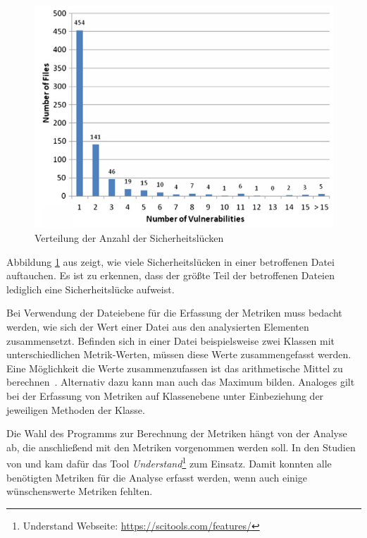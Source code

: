\begin{figure}
	\includegraphics[width=\textwidth]{img/vulnerability_distribution.png}
	\caption{Verteilung der Anzahl der Sicherheitslücken \cite{chowdhury_zulkernine_2009}}
	\label{fig:vulnerability_distribution}
\end{figure}
Abbildung \ref{fig:vulnerability_distribution} aus \cite{chowdhury_zulkernine_2009} zeigt, wie viele Sicherheitslücken in einer betroffenen Datei auftauchen.
Es ist zu erkennen, dass der größte Teil der betroffenen Dateien lediglich eine Sicherheitslücke aufweist.

Bei Verwendung der Dateiebene für die Erfassung der Metriken muss bedacht werden, wie sich der Wert einer Datei aus den analysierten Elementen zusammensetzt.
Befinden sich in einer Datei beispielsweise zwei Klassen mit unterschiedlichen Metrik-Werten, müssen diese Werte zusammengefasst werden.
Eine Möglichkeit die Werte zusammenzufassen ist das arithmetische Mittel zu berechnen~\cite{chowdhury_zulkernine_2009}.
Alternativ dazu kann man auch das Maximum bilden.
Analoges gilt bei der Erfassung von Metriken auf Klassenebene unter Einbeziehung der jeweiligen Methoden der Klasse.

Die Wahl des Programms zur Berechnung der Metriken hängt von der Analyse ab, die anschließend mit den Metriken vorgenommen werden soll.
In den Studien von \cite{alves_et_al} und \cite{chowdhury_zulkernine_2009} kam dafür das Tool \emph{Understand}\footnote{Understand Webseite: \url{https://scitools.com/features/}} zum Einsatz.
Damit konnten alle benötigten Metriken für die Analyse erfasst werden, wenn auch einige wünschenswerte Metriken fehlten.
